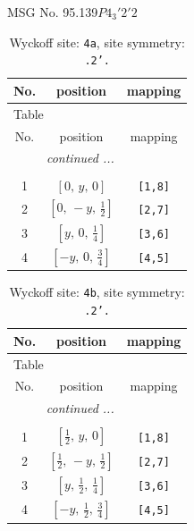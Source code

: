 \documentclass[fleqn,8pt]{jsarticle}
\begin{document}
\setcounter{MaxMatrixCols}{32}

\renewcommand{\tablename}{Table~}
\renewcommand{\figurename}{Figure~}
\begin{center}
\LARGE
MSG No. 95.139\quad$P4_{3}'2'2$
\end{center}
\renewcommand{\arraystretch}{1.2}
\begin{longtable}{ccc}
\caption{Wyckoff site: {\tt 4a}, site symmetry: {\tt .2'.}}
 \\
 \hline \hline
No. & position & mapping \\ \hline \endfirsthead

\multicolumn{2}{l}{\tablename\ \thetable{}} \\
 \hline \hline
No. & position & mapping \\ \hline \endhead

 \hline \hline
\multicolumn{2}{r}{\footnotesize\it continued ...} \\ \endfoot

 \hline \hline
\multicolumn{2}{r}{} \\ \endlastfoot

1 & $\left[ 0,\, y,\, 0 \right]$ & {\tt [1,8]} \\ \hline
2 & $\left[ 0,\, - y,\, \frac{1}{2} \right]$ & {\tt [2,7]} \\ \hline
3 & $\left[ y,\, 0,\, \frac{1}{4} \right]$ & {\tt [3,6]} \\ \hline
4 & $\left[ - y,\, 0,\, \frac{3}{4} \right]$ & {\tt [4,5]} \\
\end{longtable}
\renewcommand{\arraystretch}{1.2}
\begin{longtable}{ccc}
\caption{Wyckoff site: {\tt 4b}, site symmetry: {\tt .2'.}}
 \\
 \hline \hline
No. & position & mapping \\ \hline \endfirsthead

\multicolumn{2}{l}{\tablename\ \thetable{}} \\
 \hline \hline
No. & position & mapping \\ \hline \endhead

 \hline \hline
\multicolumn{2}{r}{\footnotesize\it continued ...} \\ \endfoot

 \hline \hline
\multicolumn{2}{r}{} \\ \endlastfoot

1 & $\left[ \frac{1}{2},\, y,\, 0 \right]$ & {\tt [1,8]} \\ \hline
2 & $\left[ \frac{1}{2},\, - y,\, \frac{1}{2} \right]$ & {\tt [2,7]} \\ \hline
3 & $\left[ y,\, \frac{1}{2},\, \frac{1}{4} \right]$ & {\tt [3,6]} \\ \hline
4 & $\left[ - y,\, \frac{1}{2},\, \frac{3}{4} \right]$ & {\tt [4,5]} \\
\end{longtable}
\end{document}
